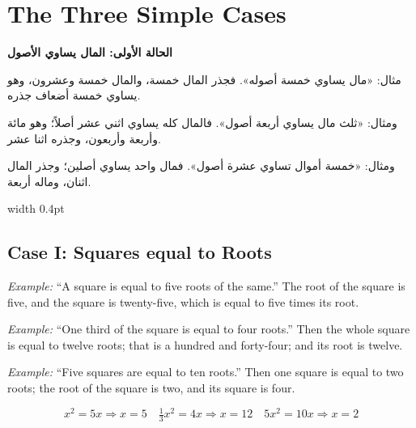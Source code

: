 \documentclass[11pt,a4paper]{book}
\begin{document}
\newpage

\section{The Three Simple Cases}

\noindent\begin{minipage}[t]{0.48\textwidth}
\raggedleft

\begin{Arabic}
\textbf{الحالة الأولى: المال يساوي الأصول}

مثال: «مال يساوي خمسة أصوله». فجذر المال خمسة، والمال خمسة وعشرون، وهو يساوي خمسة أضعاف جذره.

ومثال: «ثلث مال يساوي أربعة أصول». فالمال كله يساوي اثني عشر أصلاً؛ وهو مائة وأربعة وأربعون، وجذره اثنا عشر.

ومثال: «خمسة أموال تساوي عشرة أصول». فمال واحد يساوي أصلين؛ وجذر المال اثنان، وماله أربعة.
\end{Arabic}

\end{minipage}%
\hfill\vrule width 0.4pt\hfill
\begin{minipage}[t]{0.48\textwidth}
\raggedright

\subsection*{Case I: Squares equal to Roots}

\textit{Example:} ``A square is equal to five roots of the same.'' The root of the square is five, and the square is twenty-five, which is equal to five times its root.

\textit{Example:} ``One third of the square is equal to four roots.'' Then the whole square is equal to twelve roots; that is a hundred and forty-four; and its root is twelve.

\textit{Example:} ``Five squares are equal to ten roots.'' Then one square is equal to two roots; the root of the square is two, and its square is four.

\begin{equation}
\boxed{x^2 = 5x \Rightarrow x = 5} \quad
\boxed{\tfrac{1}{3}x^2 = 4x \Rightarrow x = 12} \quad
\boxed{5x^2 = 10x \Rightarrow x = 2}
\end{equation}

\end{minipage}
\vspace{0.3cm}
\end{document}
